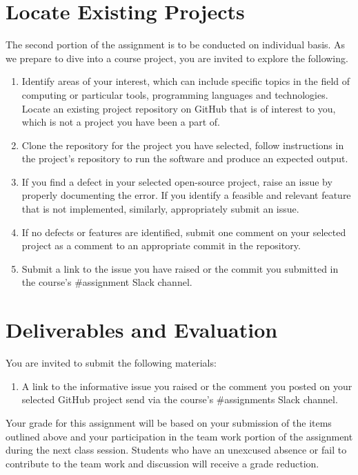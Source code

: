 \documentclass[11pt]{article}
\begin{document}
\section*{Locate Existing Projects}
The second portion of the assignment is to be conducted on individual basis. As we prepare to dive into a course project, you are invited to explore the following.
\begin{enumerate}
	\item Identify areas of your interest, which can include specific topics in the field of computing or particular tools, programming languages and technologies. Locate an existing project repository on GitHub that is of interest to you, which is not a project you have been a part of.
	\item Clone the repository for the project you have selected, follow instructions in the project's repository to run the software and  produce an expected output.
	\item If you find a defect in your selected open-source project, raise an issue by properly documenting the error. If you identify a feasible and relevant feature that is not implemented, similarly, appropriately submit an issue.
	\item If no defects or features are identified, submit one comment on your selected project as a comment to an appropriate commit in the repository. 
	\item Submit a link to the issue you have raised or the commit you submitted in the course's \#assignment Slack channel.
\end{enumerate} 

\section*{Deliverables and Evaluation}

You are invited to submit the following materials:
\begin{enumerate}
	\item A link to the informative issue you raised or the comment you posted on your selected GitHub project send via the course's \#assignments Slack channel. 
\end{enumerate}

Your grade for this assignment will be based on your submission of the items outlined above and your participation in the team work portion of the assignment during the next class session. Students who have an unexcused absence or fail to contribute to the team work and discussion will receive a grade reduction.
\end{document}
